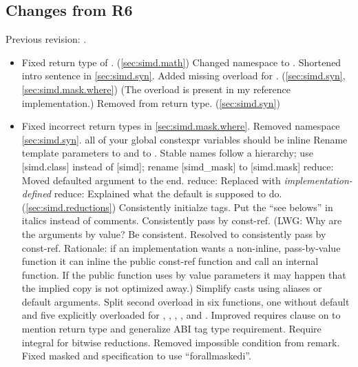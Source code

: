 \subsection{Changes from R6}
Previous revision: \parencite{P0214R6}.
\begin{itemize}
  \item Fixed return type of . (\ref{sec:simd.math})
  \chck Changed namespace to .
  \chck Shortened intro sentence in \ref{sec:simd.syn}.
  \chck Added missing  overload for . (\ref{sec:simd.syn}, \ref{sec:simd.mask.where}) (The overload is present in my reference implementation.)
  \chck Removed  from  return type. (\ref{sec:simd.syn})
  \item Fixed incorrect  return types in \ref{sec:simd.mask.where}.
  \chck Removed  namespace \ref{sec:simd.syn}.
  \chck all of your global constexpr variables should be inline
  \chck Rename template parameters  to  and  to .
  \chck Stable names follow a hierarchy; use [simd.class] instead of [simd]; rename [simd_mask] to [simd.mask]
  \chck reduce: Moved defaulted  argument to the end.
  \chck reduce: Replaced  with \emph{implementation-defined}
  \chck reduce: Explained what the default  is supposed to do. (\ref{sec:simd.reductions})
  \chck Consistently initialze tags.
  \chck Put the “see belows” in italics instead of comments.
  \chck Consistently pass by const-ref.
  (LWG: Why are the arguments by value?
  Be consistent.
  Resolved to consistently pass by const-ref. Rationale: if an implementation wants a non-inline, pass-by-value function it can inline the public const-ref function and call an internal function.
  If the public function uses by value parameters it may happen that the implied copy is not optimized away.)
  \chck Simplify casts using aliases or default arguments.
  \chck Split second  overload in six functions, one without default  and five explicitly overloaded for , , , , and .
  \chck Improved requires clause on  to mention return type and generalize ABI tag type requirement.
  \chck Require integral  for bitwise reductions.
  \chck Removed impossible condition from  remark.
  \chck Fixed masked  and  specification to use “forallmaskedi”.

\end{itemize}
